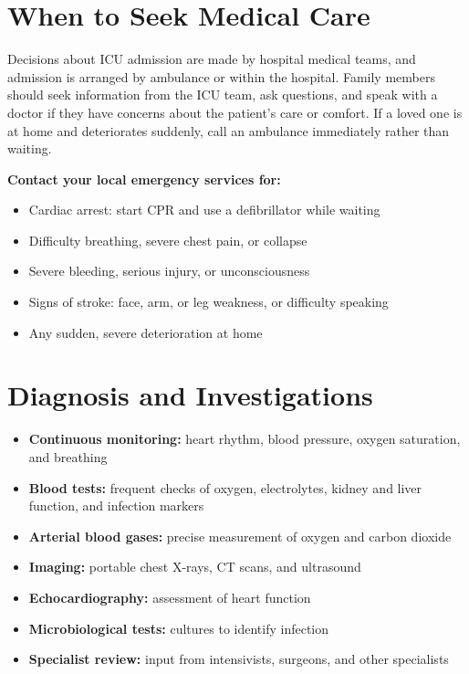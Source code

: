 \section*{When to Seek Medical Care}
Decisions about ICU admission are made by hospital medical teams, and admission is arranged by ambulance or within the hospital. Family members should seek information from the ICU team, ask questions, and speak with a doctor if they have concerns about the patient's care or comfort. If a loved one is at home and deteriorates suddenly, call an ambulance immediately rather than waiting.

\textbf{Contact your local emergency services for:}
\begin{itemize}
    \item Cardiac arrest: start CPR and use a defibrillator while waiting
    \item Difficulty breathing, severe chest pain, or collapse
    \item Severe bleeding, serious injury, or unconsciousness
    \item Signs of stroke: face, arm, or leg weakness, or difficulty speaking
    \item Any sudden, severe deterioration at home
\end{itemize}

\section*{Diagnosis and Investigations}
\begin{itemize}
    \item \textbf{Continuous monitoring:} heart rhythm, blood pressure, oxygen saturation, and breathing
    \item \textbf{Blood tests:} frequent checks of oxygen, electrolytes, kidney and liver function, and infection markers
    \item \textbf{Arterial blood gases:} precise measurement of oxygen and carbon dioxide
    \item \textbf{Imaging:} portable chest X-rays, CT scans, and ultrasound
    \item \textbf{Echocardiography:} assessment of heart function
    \item \textbf{Microbiological tests:} cultures to identify infection
    \item \textbf{Specialist review:} input from intensivists, surgeons, and other specialists
\end{itemize}

